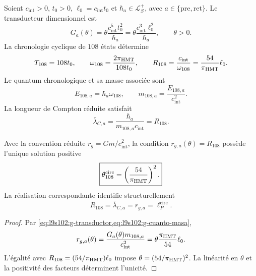 Soient \(c_{\mathrm{int}}>0\), \(t_0>0\),
\(\ell_0=c_{\mathrm{int}}t_0\) et
\(\hbar_a\in\mathcal L_S^+\), avec
\(a\in\{\mathrm{pre},\mathrm{ret}\}\). Le transducteur dimensionnel est
\begin{equation}
 G_a(\theta)
 =\theta\frac{c_{\mathrm{int}}^5t_0^2}{\hbar_a}
 =\theta\frac{c_{\mathrm{int}}^3\ell_0^2}{\hbar_a},
 \qquad \theta>0.
 \label{eq:l9s102:g-transductor}
\end{equation}
La chronologie cyclique de \(108\) états détermine
\begin{equation}
 T_{108}=108t_0,
 \qquad
 \omega_{108}=\frac{2\pi_{\rm HMT}}{108t_0},
 \qquad
 R_{108}=\frac{c_{\mathrm{int}}}{\omega_{108}}
 =\frac{54}{\pi_{\rm HMT}}\ell_0.
 \label{eq:l9s102:g-reloj108}
\end{equation}
Le quantum chronologique et sa masse associée sont
\begin{equation}
 E_{108,a}=\hbar_a\omega_{108},
 \qquad
 m_{108,a}=\frac{E_{108,a}}{c_{\mathrm{int}}^2}.
 \label{eq:l9s102:g-cuanto-masa}
\end{equation}
La longueur de Compton réduite satisfait
\begin{equation}
 \bar\lambda_{C,a}
 =\frac{\hbar_a}{m_{108,a}c_{\mathrm{int}}}=R_{108}.
 \label{eq:l9s102:g-compton}
\end{equation}

\begin{theorem}
\label{thm:l9s102:g-selector}
Avec la convention réduite \(r_g=Gm/c_{\mathrm{int}}^2\), la condition
\(r_{g,a}(\theta)=R_{108}\) possède l'unique solution positive
\begin{equation}
 \boxed{
 \theta_{108}^{\mathrm{circ}}=\left(\frac{54}{\pi_{\rm HMT}}\right)^2.}
 \label{eq:l9s102:g-theta}
\end{equation}
La réalisation correspondante identifie structurellement
\begin{equation}
 R_{108}=\bar\lambda_{C,a}=r_{g,a}=\ell_P^{\mathrm{circ}}.
 \label{eq:l9s102:g-cuatro-longitudes}
\end{equation}
\end{theorem}

\begin{proof}
Par \cref{eq:l9s102:g-transductor,eq:l9s102:g-cuanto-masa},
\[
 r_{g,a}(\theta)
 =\frac{G_a(\theta)m_{108,a}}{c_{\mathrm{int}}^2}
 =\theta\frac{\pi_{\rm HMT}}{54}\ell_0.
\]
L'égalité avec \(R_{108}=(54/\pi_{\rm HMT})\ell_0\) impose
\(\theta=(54/\pi_{\rm HMT})^2\). La linéarité en \(\theta\) et la positivité des
facteurs déterminent l'unicité.
\end{proof}

